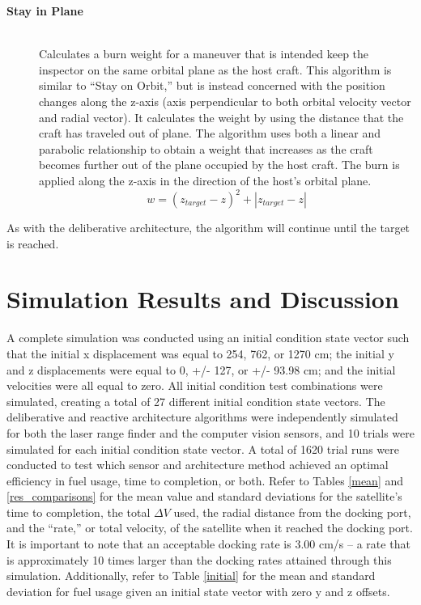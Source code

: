 \documentclass[journal, 10pt]{IEEEtran}
\begin{document}
\begin{description}
\item[\textbf{Stay in Plane}] \hfill \\
Calculates a burn weight for a maneuver that is intended keep the inspector on the same orbital plane as the host craft.  This algorithm is similar to ``Stay on Orbit,'' but is instead concerned with the position changes along the z-axis (axis perpendicular to both orbital velocity vector and radial vector).  It calculates the weight by using the distance that the craft has traveled out of plane.  The algorithm uses both a linear and parabolic relationship to obtain a weight that increases as the craft becomes further out of the plane occupied by the host craft.  The burn is applied along the z-axis in the direction of the host's orbital plane.
\begin{equation}
w = (z_{target}-z)^2+|z_{target}-z|
\end{equation}
\end{description}

As with the deliberative architecture, the algorithm will continue until the target is reached.

\section{Simulation Results and Discussion} \label{discuss}
A complete simulation was conducted using an initial condition state vector such that the initial x displacement was equal to 254, 762, or 1270 cm; the initial y and z displacements were equal to 0, +/- 127, or +/- 93.98 cm; and the initial velocities were all equal to zero. All initial condition test combinations were simulated, creating a total of 27 different initial condition state vectors. The deliberative and reactive architecture algorithms were independently simulated for both the laser range finder and the computer vision sensors, and 10 trials were simulated for each initial condition state vector. A total of 1620 trial runs were conducted to test which sensor and architecture method achieved an optimal efficiency in fuel usage, time to completion, or both. Refer to Tables \ref{mean} and \ref{res_comparisons} for the mean value and standard deviations for the satellite's time to completion, the total $\Delta V$ used, the radial distance from the docking port, and the ``rate,'' or total velocity, of the satellite when it reached the docking port. It is important to note that an acceptable docking rate is 3.00 cm/s -- a rate that is approximately 10 times larger than the docking rates attained through this simulation. Additionally, refer to Table \ref{initial} for the mean and standard deviation for fuel usage given an initial state vector with zero y and z offsets.
\end{document}
